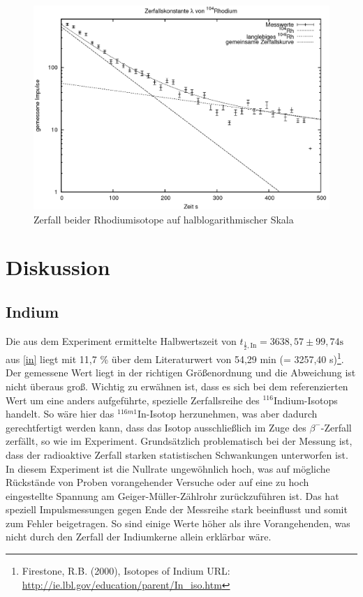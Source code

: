 \begin{figure}[h]
	\includegraphics[width=1\textwidth]{pics/rhodium.png}
	\caption{Zerfall beider Rhodiumisotope auf halblogarithmischer Skala}
\end{figure}


\section{Diskussion}
\subsection{Indium}
Die aus dem Experiment ermittelte Halbwertszeit von $t_{\frac12,\text{In}} = 3638,57 \pm 99,74 \text{s}$ aus \eqref{in} liegt mit 11,7 \% über dem
Literaturwert von 54,29 min (= 3257,40 s)\footnote[1]{Firestone, R.B. (2000), Isotopes of Indium URL: \href{http://ie.lbl.gov/education/parent/In\_iso.htm}{http://ie.lbl.gov/education/parent/In\_iso.htm}}.
Der gemessene Wert liegt in der richtigen Größenordnung und die Abweichung ist nicht überaus groß. Wichtig zu erwähnen ist, dass es
sich bei dem referenzierten Wert um eine anders aufgeführte, spezielle Zerfallsreihe des $^{116}$Indium-Isotops handelt. So wäre hier
das $^{116m1}$In-Isotop herzunehmen, was aber dadurch gerechtfertigt werden kann, dass das Isotop ausschließlich im Zuge des $\beta^-$-Zerfall
zerfällt, so wie im Experiment. Grundsätzlich problematisch bei der Messung ist, dass der radioaktive Zerfall starken statistischen Schwankungen unterworfen ist. In diesem Experiment
ist die Nullrate ungewöhnlich hoch, was auf mögliche Rückstände von Proben vorangehender Versuche oder auf eine zu hoch
eingestellte Spannung am Geiger-Müller-Zählrohr zurückzuführen ist. Das hat speziell Impulsmessungen gegen Ende der Messreihe
stark beeinflusst und somit zum Fehler beigetragen. So sind einige Werte höher als ihre Vorangehenden, was nicht durch den
Zerfall der Indiumkerne allein erklärbar wäre.

